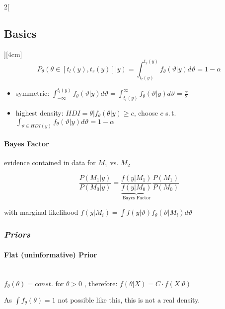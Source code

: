 \documentclass[8pt]{extarticle}
\begin{document}
\begin{multicols}{2}[\subsection{Basics}][4cm]
$$P_\theta(\theta\in \left[t_l(y),t_r(y)\right]|y) = \int_{t_l(y)}^{t_r(y)} f_\theta(\vartheta|y)d\vartheta = 1- \alpha$$

\begin{itemize}
\item symmetric: $\int_{-\infty}^{t_l(y)} f_\theta(\vartheta|y)d\vartheta = \int_{t_r(y)}^{\infty} f_\theta(\vartheta|y)d\vartheta = \frac{\alpha}{2}$
\item highest density: $HDI = {\theta|f_\theta(\theta|y)\geq c}$, choose $c$ s.\,t.\  $\int_{\vartheta \in HDI(y)} f_\theta(\vartheta|y)d\vartheta = 1-\alpha$
\end{itemize}




\paragraph{Bayes Factor} evidence contained in data for $M_1$ vs. $M_2$

$$\frac{P(M_1|y)}{P(M_0|y)} =  \underbrace{\frac{f(y|M_1)}{f(y|M_0)}}_{\text{Bayes Factor}} \frac{P(M_1)}{P(M_0)}$$

with marginal likelihood $f(y|M_i) = \int f(y|\vartheta)f_\theta(\vartheta|M_i)d\vartheta$


\subsubsection*{\textit{Priors}}

\paragraph{Flat (uninformative) Prior} \ \\

\noindent $f_\theta(\theta)=const. \text{ for } \theta > 0$
,  therefore:
 $f(\theta | X) = C \cdot f(X | \theta )$

\noindent As $\int f_\theta(\theta) =1$ not possible like this, this is not a real density.


\end{multicols}
\end{document}
